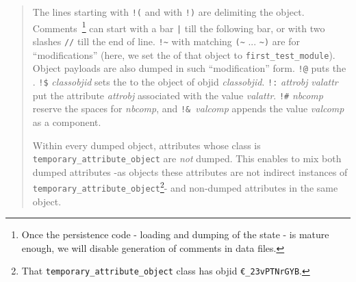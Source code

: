 \begin{quote}
\begin{small}
  
  The lines starting with \texttt{!(} and with \texttt{!)} are
  delimiting the object. Comments~\footnote{Once the persistence code
    - loading and dumping of the state - is mature enough, we will
    disable generation of comments in data files.} can start with a
  bar \texttt{|} till the following bar, or with two slashes
  \texttt{//} till the end of line.  {\verb+!~+} with matching
         {\verb+(~+} ... \verb+~)+ are for ``modifications'' (here, we
         set the  of that object to
         \texttt{first\_test\_module}). Object payloads are also
         dumped in such ``modification'' form. \verb+!@+ puts the
         . \verb+!$+ \textit{classobjid}
         sets the  to the object of objid
         \textit{classobjid}. \verb+!:+ \textit{attrobj}
         \textit{valattr} put the attribute \textit{attrobj}
         associated with the value \textit{valattr}. \verb+!#+
         \textit{nbcomp} reserve the spaces for \textit{nbcomp}, and
         \verb/!&/~\textit{valcomp} appends the value \textit{valcomp}
         as a component.

         Within every dumped object, attributes whose class is
         \texttt{temporary\_attribute\_object} are \emph{not}
          dumped. This
         enables to mix both dumped attributes -as objects these
         attributes are not indirect instances of
         \texttt{temporary\_attribute\_object}\footnote{That
           \texttt{temporary\_attribute\_object} class has objid
           \texttt{€\_23vPTNrGYB}.}- and non-dumped attributes in the
         same object.
\end{small}
\end{quote}


